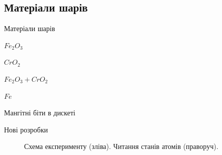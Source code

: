 \documentclass{beamer}
\begin{document}
    \subsection{Матеріали   шарів}
    \begin{frame}[label=simmonshall]{Матеріали   шарів}
    
      \begin{block}{$Fe_2O_3$}
      \end{block}

      \begin{block}{$CrO_2$}
      \end{block}

      \begin{block}{$Fe_2O_3 + CrO_2$}
      \end{block}

      \begin{block}{$Fe$}  
      \end{block}

    \end{frame}
    \begin{frame}[label=proof]{Мангітні біти в дискеті}
    
    \begin{figure}[h]
    \end{figure}

    \end{frame}

  \begin{frame}[label=proof]{Нові розробки}
  \begin{figure}[h]
  \caption{Схема експерименту (зліва). Читання станів атомів (праворуч).}
  \end{figure}
  \end{frame}
\end{document}
